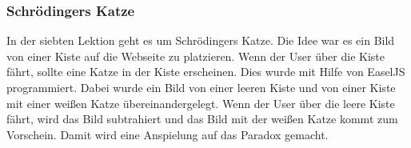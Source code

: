\subsubsection{Schrödingers Katze}
In der siebten Lektion geht es um Schrödingers Katze. Die Idee war es ein Bild von einer Kiste auf die Webseite zu platzieren. Wenn der User über die Kiste fährt, sollte eine Katze in der Kiste erscheinen. Dies wurde mit Hilfe von EaselJS programmiert. Dabei wurde ein Bild von einer leeren Kiste und von einer Kiste mit einer weißen Katze übereinandergelegt. Wenn der User über die leere Kiste fährt, wird das Bild subtrahiert und das Bild mit der weißen Katze kommt zum Vorschein. Damit wird eine Anspielung auf das Paradox gemacht. 
